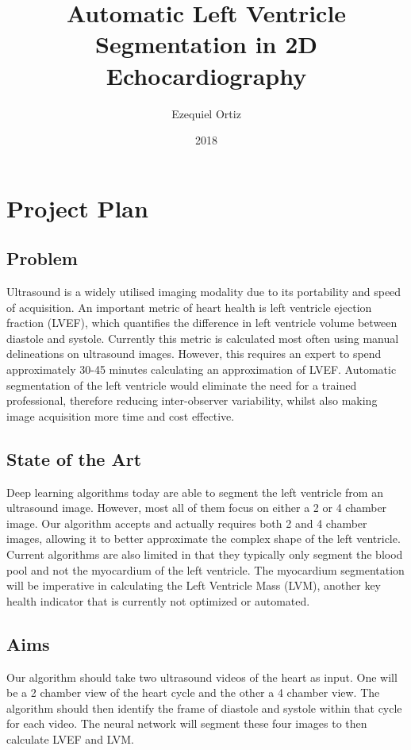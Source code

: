 \documentclass[12pt]{article}
\title{Automatic Left Ventricle Segmentation in 2D Echocardiography}
\date{2018}
\author{Ezequiel Ortiz}
\newcommand{\changelocaltocdepth}[1]{%
  \addtocontents{toc}{\protect\setcounter{tocdepth}{#1}}%
  \setcounter{tocdepth}{#1}%
}
\begin{document}
\maketitle
\newpage
{}
\setcounter{secnumdepth}{0}
\changelocaltocdepth{0}

\section{Project Plan}
\subsection{Problem}
Ultrasound is a widely utilised imaging modality due to its portability and speed of acquisition. An important metric of heart health is left ventricle ejection fraction (LVEF), which quantifies the difference in left ventricle volume between diastole and systole. Currently this metric is calculated most often using manual delineations on ultrasound images. However, this requires an expert to spend approximately 30-45 minutes calculating an approximation of LVEF. Automatic segmentation of the left ventricle would  eliminate the need for a trained professional, therefore reducing inter-observer variability, whilst also making image acquisition more time and cost effective.

\subsection{State of the Art}
Deep learning algorithms today are able to segment the left ventricle from an ultrasound image. However, most all of them focus on either a 2 or 4 chamber image. Our algorithm accepts and actually requires both 2 and 4 chamber images, allowing it to better approximate the complex shape of the left ventricle. Current algorithms are also limited in that they typically only segment the blood pool and not the myocardium of the left ventricle. The myocardium segmentation will be imperative in calculating the Left Ventricle Mass (LVM), another key health indicator that is currently not optimized or automated.

\subsection{Aims}
Our algorithm should take two ultrasound videos of the heart as input. One will be a 2 chamber view of the heart cycle and the other a 4 chamber view. The algorithm should then identify the frame of diastole and systole within that cycle for each video. The neural network will segment these four images to then calculate LVEF and LVM.
\end{document}
